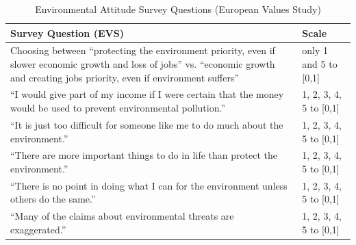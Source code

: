 \documentclass[12pt, a4paper]{article}
\begin{document}
\begin{table}[htbp]
\centering
\caption{Environmental Attitude Survey Questions (European Values Study)}
\label{tab:evs_questions}
\renewcommand{\arraystretch}{1.25}
\begin{tabular}{p{12cm} p{3.5cm}}
\hline
\textbf{Survey Question (EVS)} & \textbf{Scale} \\
\hline
Choosing between ``protecting the environment priority, 
even if slower economic growth and loss of jobs'' vs. ``economic growth and creating jobs priority, even if environment 
suffers'' & only 1 and 5 to [0,1]\\

``I would give part of my income if I were certain that the money would be used to prevent environmental pollution.'' & 1, 2, 3, 4, 5 to [0,1]\\

``It is just too difficult for someone like me to do much about the environment.'' & 1, 2, 3, 4, 5 to [0,1]\\

``There are more important things to do in life than protect the environment.'' & 1, 2, 3, 4, 5 to [0,1]\\

``There is no point in doing what I can for the environment unless others do the same.'' & 1, 2, 3, 4, 5 to [0,1]\\

``Many of the claims about environmental threats are exaggerated.'' & 1, 2, 3, 4, 5 to [0,1]\\
\hline
\end{tabular}
\end{table}
\end{document}
